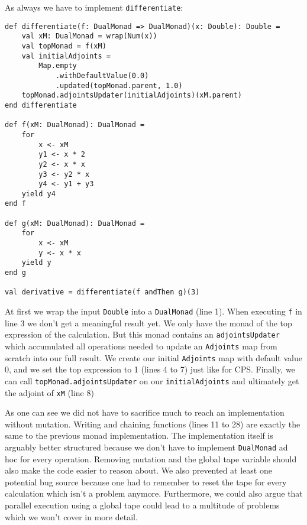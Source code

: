 As always we have to implement \lstinline{differentiate}:
\begin{lstlisting}
def differentiate(f: DualMonad => DualMonad)(x: Double): Double =
    val xM: DualMonad = wrap(Num(x))
    val topMonad = f(xM)
    val initialAdjoints =
        Map.empty
            .withDefaultValue(0.0)
            .updated(topMonad.parent, 1.0)
    topMonad.adjointsUpdater(initialAdjoints)(xM.parent)
end differentiate

def f(xM: DualMonad): DualMonad =
    for
        x <- xM
        y1 <- x * 2
        y2 <- x * x
        y3 <- y2 * x
        y4 <- y1 + y3
    yield y4
end f

def g(xM: DualMonad): DualMonad =
    for
        x <- xM
        y <- x * x
    yield y
end g

val derivative = differentiate(f andThen g)(3)
\end{lstlisting}
At first we wrap the input \lstinline{Double} into a \lstinline{DualMonad} (line 1). When executing \lstinline{f} in line 3 we don't get a meaningful result yet. We only have the monad of the top expression of the calculation. But this monad contains an \lstinline{adjointsUpdater} which accumulated all operations needed to update an \lstinline{Adjoints} map from scratch into our full result. We create our initial \lstinline{Adjoints} map with default value 0, and we set the top expression to 1 (lines 4 to 7) just like for CPS. Finally, we can call \lstinline{topMonad.adjointsUpdater} on our \lstinline{initialAdjoints} and ultimately get the adjoint of \lstinline{xM} (line 8)

As one can see we did not have to sacrifice much to reach an implementation without mutation. Writing and chaining functions (lines 11 to 28) are exactly the same to the previous monad implementation. The implementation itself is arguably better structured because we don't have to implement \lstinline{DualMonad} ad hoc for every operation. Removing mutation and the global tape variable should also make the code easier to reason about. We also prevented at least one potential bug source because one had to remember to reset the tape for every calculation which isn't a problem anymore. Furthermore, we could also argue that parallel execution using a global tape could lead to a multitude of problems which we won't cover in more detail.
